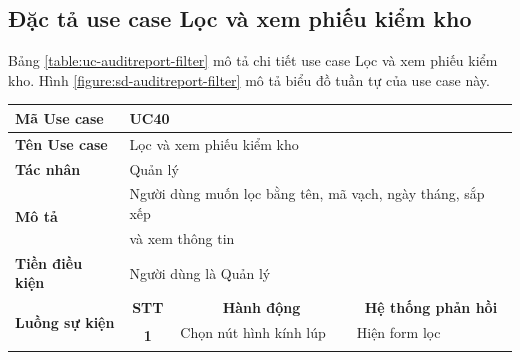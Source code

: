 \documentclass[../DoAn.tex]{subfiles}
\begin{document}
\subsection{Đặc tả use case Lọc và xem phiếu kiểm kho}
\label{section:uc-auditreport-filter}
Bảng \ref{table:uc-auditreport-filter} mô tả chi tiết use case Lọc và xem phiếu kiểm kho. Hình \ref{figure:sd-auditreport-filter} mô tả biểu đồ tuần tự của use case này.
\begin{table}[H]
    \begin{tabular}{|l|c|l|l|}
        \hline
        \textbf{Mã Use case}                    & \multicolumn{3}{l|}{UC40}                                                                                                                                                   \\ \hline
        \textbf{Tên Use case}                   & \multicolumn{3}{l|}{Lọc và xem phiếu kiểm kho}                                                                                                                              \\ \hline
        \textbf{Tác nhân}                       & \multicolumn{3}{l|}{Quản lý}                                                                                                                                                \\ \hline
        \multirow{2}{*}{\textbf{Mô tả} }        & \multicolumn{3}{l|}{Người dùng muốn lọc bằng tên, mã vạch, ngày tháng, sắp xếp}                                                                                             \\
                                                & \multicolumn{3}{l|}{và xem thông tin}                                                                                                                                       \\ \hline
        \textbf{Tiền điều kiện}                 & \multicolumn{3}{l|}{Người dùng là Quản lý}                                                                                                                                  \\ \hline
        \multirow{7}{*}{\textbf{Luồng sự kiện}} & \multicolumn{1}{c|}{\textbf{STT}}                                               & \multicolumn{1}{c|}{\textbf{Hành động}} & \multicolumn{1}{c|}{\textbf{Hệ thống phản hồi}} \\ \cline{2-4}
                                                & \multirow{6}{*}{\textbf{1}}                                                     & Chọn nút hình kính lúp                  & Hiện form lọc                                   \\ \cline{3-4}

\end{tabular}
\end{table}
\end{document}
